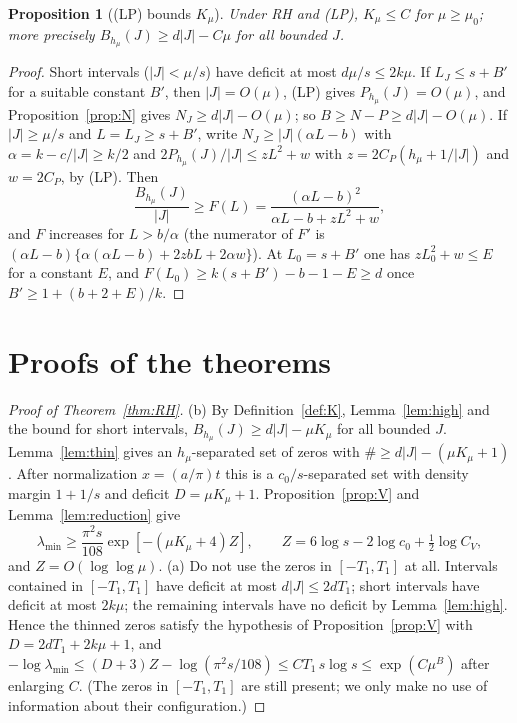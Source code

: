 \documentclass[11pt]{amsart}
\newtheorem{proposition}{Proposition}[section]
\theoremstyle{definition}
\theoremstyle{remark}
\numberwithin{equation}{section}
\begin{document}
\begin{proposition}[(LP) bounds $K_\mu$]\label{prop:LPK}
Under RH and (LP), $K_\mu\le C$ for $\mu\ge\mu_0$; more precisely $B_{h_\mu}(J)\ge d|J|-C\mu$ for all bounded $J$.
\end{proposition}
\begin{proof}
Short intervals ($|J|<\mu/s$) have deficit at most $d\mu/s\le2k\mu$. If $L_J\le s+B'$ for a suitable constant $B'$, then $|J|=O(\mu)$, (LP) gives $P_{h_\mu}(J)=O(\mu)$, and Proposition~\ref{prop:N} gives $N_J\ge d|J|-O(\mu)$; so $B\ge N-P\ge d|J|-O(\mu)$. If $|J|\ge\mu/s$ and $L=L_J\ge s+B'$, write $N_J\ge|J|(\alpha L-b)$ with $\alpha=k-c/|J|\ge k/2$ and $2P_{h_\mu}(J)/|J|\le zL^2+w$ with $z=2C_P(h_\mu+1/|J|)$ and $w=2C_P$, by (LP). Then
\[
\frac{B_{h_\mu}(J)}{|J|}\ge F(L)=\frac{(\alpha L-b)^2}{\alpha L-b+zL^2+w},
\]
and $F$ increases for $L>b/\alpha$ (the numerator of $F'$ is $(\alpha L-b)\{\alpha(\alpha L-b)+2zbL+2\alpha w\}$). At $L_0=s+B'$ one has $zL_0^2+w\le E$ for a constant $E$, and $F(L_0)\ge k(s+B')-b-1-E\ge d$ once $B'\ge1+(b+2+E)/k$.
\end{proof}

\section{Proofs of the theorems}\label{sec:proofs}

\begin{proof}[Proof of Theorem~\ref{thm:RH}]
(b) By Definition~\ref{def:K}, Lemma~\ref{lem:high} and the bound for short intervals, $B_{h_\mu}(J)\ge d|J|-\mu K_\mu$ for all bounded $J$. Lemma~\ref{lem:thin} gives an $h_\mu$-separated set of zeros with $\#\ge d|J|-(\mu K_\mu+1)$. After normalization $x=(a/\pi)t$ this is a $c_0/s$-separated set with density margin $1+1/s$ and deficit $D=\mu K_\mu+1$. Proposition~\ref{prop:V} and Lemma~\ref{lem:reduction} give
\[
\lambda_{\min}\ge\frac{\pi^2s}{108}\exp[-(\mu K_\mu+4)Z],\qquad Z=6\log s-2\log c_0+\tfrac12\log C_V,
\]
and $Z=O(\log\log\mu)$.
(a) Do not use the zeros in $[-T_1,T_1]$ at all. Intervals contained in $[-T_1,T_1]$ have deficit at most $d|J|\le2dT_1$; short intervals have deficit at most $2k\mu$; the remaining intervals have no deficit by Lemma~\ref{lem:high}. Hence the thinned zeros satisfy the hypothesis of Proposition~\ref{prop:V} with $D=2dT_1+2k\mu+1$, and $-\log\lambda_{\min}\le(D+3)Z-\log(\pi^2s/108)\le CT_1\,s\log s\le\exp(C\mu^B)$ after enlarging $C$. (The zeros in $[-T_1,T_1]$ are still present; we only make no use of information about their configuration.)
\end{proof}
\end{document}

